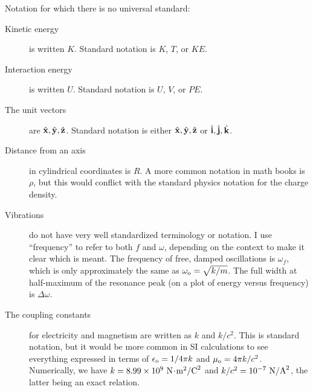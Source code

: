 \noindent Notation for which there is no universal standard:
\begin{description}
	\item[Kinetic energy] is written $K$. Standard notation is $K$, $T$, or $KE$.
	\item[Interaction energy] is written $U$. Standard notation is $U$, $V$, or $PE$.
	\item[The unit vectors] are $\hat{\mathbf{x}},\hat{\mathbf{y}},\hat{\mathbf{z}}$. 
		Standard notation is either $\hat{\mathbf{x}},\hat{\mathbf{y}},\hat{\mathbf{z}}$ or
		$\hat{\mathbf{i}},\hat{\mathbf{j}},\hat{\mathbf{k}}$.
	\item[Distance from an axis] in cylindrical coordinates is $R$. A more common
		notation in math books is $\rho$, but this would conflict with the standard
		physics notation for the charge density.
	\item[Vibrations] do not have very well standardized terminology or notation. I use
		``frequency'' to refer to both $f$ and $\omega$, depending on the context to
		make it clear which is meant. The frequency of free, damped oscillations 
		is $\omega_f$, which is only approximately the same as $\omega_{\textup{o}}=\sqrt{k/m}$.
		The full width at half-maximum of the resonance peak (on a plot of energy versus
		frequency) is $\Delta\omega$.
	\item[The coupling constants] for electricity and magnetism are written as
		$k$ and $k/c^2$. This is standard notation, but it would be more common in 
		SI calculations to see everything expressed in terms of
		$\epsilon_{\textup{o}}=1/4\pi k$ and $\mu_{\textup{o}}=4\pi k/c^2$.
		Numerically, we have $k=8.99\times10^9\ \zu{N}\unitdot\zu{m}^2/\zu{C}^2$
		and $k/c^2=10^{-7}\ \textup{N}/\textup{A}^2$, the latter being
		an exact relation.
		
\end{description}

